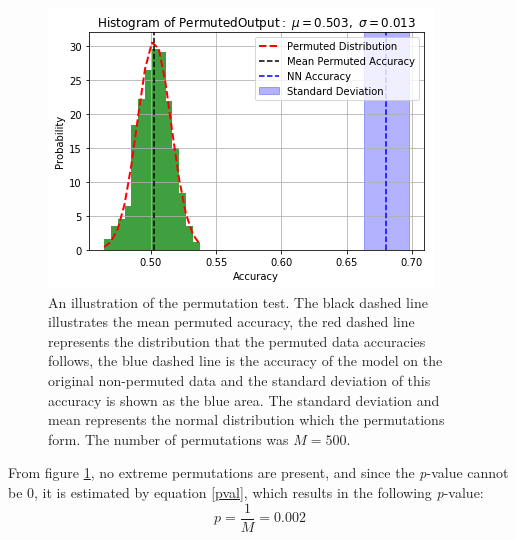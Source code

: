 \documentclass[11pt, fleqn, titlepage]{article}
\begin{document}
	\begin{figure}[H]
		\centering
		\includegraphics[width=0.5\linewidth]{imgs/rigtig_perm_test.png}
		\caption{An illustration of the permutation test. The black dashed line illustrates the mean permuted accuracy, the red dashed line represents the distribution that the permuted data accuracies follows, the blue dashed line is the accuracy of the model on the original non-permuted data and the standard deviation of this accuracy is shown as the blue area. The standard deviation and mean represents the normal distribution which the permutations form. The number of permutations was $ M =500 $.}
		\label{fig:permtest}
	\end{figure}
	
	\noindent From figure \ref{fig:permtest}, no extreme permutations are present, and since the \textit{p}-value cannot be 0, it is estimated by equation \ref{pval}, which results in the following \textit{p}-value:
	\[p=\frac{1}{M}=0.002\]
	\newpage
\end{document}
